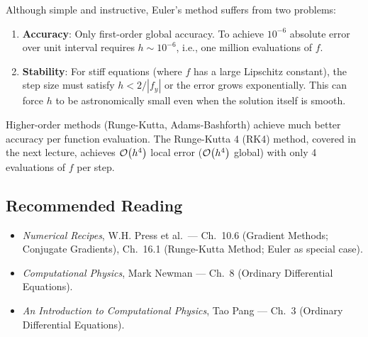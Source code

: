 \begin{tcolorbox}[colback=red!5!white,colframe=red!75!black,
  title=Why Euler's Method is Rarely Used in Practice]
Although simple and instructive, Euler's method suffers from two problems:
\begin{enumerate}
    \item \textbf{Accuracy}: Only first-order global accuracy. To achieve
    $10^{-6}$ absolute error over unit interval requires $h \sim 10^{-6}$,
    i.e., one million evaluations of $f$.
    \item \textbf{Stability}: For stiff equations (where $f$ has a large
    Lipschitz constant), the step size must satisfy $h < 2/|f_y|$ or the
    error grows exponentially. This can force $h$ to be astronomically small
    even when the solution itself is smooth.
\end{enumerate}
Higher-order methods (Runge-Kutta, Adams-Bashforth) achieve much better
accuracy per function evaluation. The Runge-Kutta 4 (RK4) method, covered in
the next lecture, achieves $\mathcal{O}\!\left(h^4\right)$ local error ($\mathcal{O}\!\left(h^4\right)$ global)
with only 4 evaluations of $f$ per step.
\end{tcolorbox}

\subsection*{Recommended Reading}
\begin{itemize}
    \item \textit{Numerical Recipes}, W.H. Press et al.\ --- Ch.\ 10.6
    (Gradient Methods; Conjugate Gradients), Ch.\ 16.1 (Runge-Kutta Method;
    Euler as special case).
    \item \textit{Computational Physics}, Mark Newman --- Ch.\ 8 (Ordinary
    Differential Equations).
    \item \textit{An Introduction to Computational Physics}, Tao Pang ---
    Ch.\ 3 (Ordinary Differential Equations).
\end{itemize}
